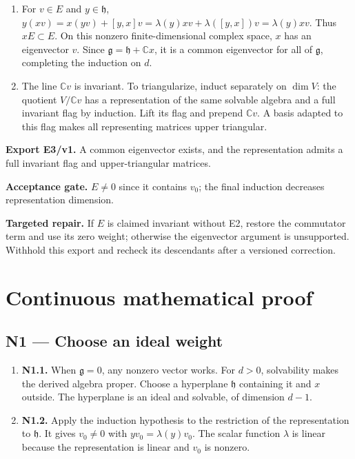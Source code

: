 \documentclass[preprint,12pt,aps,pra,showkeys,amsmath,amssymb,superscriptaddress,floatfix]{revtex4-2}
\theoremstyle{definition}
\theoremstyle{remark}
\newcommand{\field}[2]{\par\smallskip\noindent\textbf{#1.} #2\par}
\begin{document}
\begin{enumerate}[label=N3.\arabic*,leftmargin=3.4em]

\item For \(v\in E\) and \(y\in\mathfrak h\),
\(y(xv)=x(yv)+[y,x]v=\lambda(y)xv+\lambda([y,x])v=\lambda(y)xv\). Thus
\(xE\subset E\). On this nonzero finite-dimensional complex space, \(x\)
has an eigenvector \(v\). Since \(\mathfrak g=\mathfrak h+\mathbb Cx\),
it is a common eigenvector for all of \(\mathfrak g\), completing the
induction on \(d\).

\item The line \(\mathbb Cv\) is invariant. To triangularize, induct
separately on \(\dim V\): the quotient \(V/\mathbb Cv\) has a
representation of the same solvable algebra and a full invariant flag by
induction. Lift its flag and prepend \(\mathbb Cv\). A basis adapted to
this flag makes all representing matrices upper triangular.

\end{enumerate}

\field{Export E3/v1}{A common eigenvector exists, and the representation admits a full
invariant flag and upper-triangular matrices.}

\field{Acceptance gate}{\(E\ne0\) since it contains \(v_0\); the final induction decreases
representation dimension.}

\field{Targeted repair}{If \(E\) is claimed invariant without E2, restore the commutator term
and use its zero weight; otherwise the eigenvector argument is
unsupported. Withhold this export and recheck its descendants after a
versioned correction.}

\endgroup\clearpage\section{Continuous mathematical proof}\label{sec:proof}

\subsection{N1 --- Choose an ideal
weight}\label{n1-choose-an-ideal-weight}

\begin{enumerate}
\def\labelenumi{\arabic{enumi}.}
\item
  \textbf{N1.1.} When \(\mathfrak g=0\), any nonzero vector works. For
  \(d>0\), solvability makes the derived algebra proper. Choose a
  hyperplane \(\mathfrak h\) containing it and \(x\) outside. The
  hyperplane is an ideal and solvable, of dimension \(d-1\).
\item
  \textbf{N1.2.} Apply the induction hypothesis to the restriction of
  the representation to \(\mathfrak h\). It gives \(v_0\ne0\) with
  \(yv_0=\lambda(y)v_0\). The scalar function \(\lambda\) is linear
  because the representation is linear and \(v_0\) is nonzero.
\end{enumerate}
\end{document}
